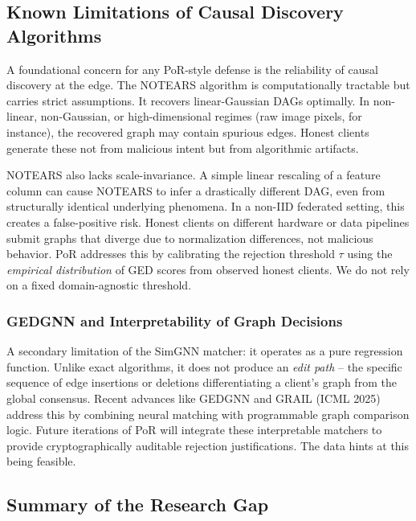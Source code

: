 \documentclass[journal]{IEEEtran}
\begin{document}
\subsection{Known Limitations of Causal Discovery Algorithms}

A foundational concern for any PoR-style defense is the reliability of causal discovery at the edge. The NOTEARS algorithm \cite{zheng2018} is computationally tractable but carries strict assumptions. It recovers linear-Gaussian DAGs optimally. In non-linear, non-Gaussian, or high-dimensional regimes (raw image pixels, for instance), the recovered graph may contain spurious edges. Honest clients generate these not from malicious intent but from algorithmic artifacts.

NOTEARS also lacks scale-invariance. A simple linear rescaling of a feature column can cause NOTEARS to infer a drastically different DAG, even from structurally identical underlying phenomena. In a non-IID federated setting, this creates a false-positive risk. Honest clients on different hardware or data pipelines submit graphs that diverge due to normalization differences, not malicious behavior. PoR addresses this by calibrating the rejection threshold $\tau$ using the \emph{empirical distribution} of GED scores from observed honest clients. We do not rely on a fixed domain-agnostic threshold.

\subsubsection{GEDGNN and Interpretability of Graph Decisions}
A secondary limitation of the SimGNN \cite{simgnn} matcher: it operates as a pure regression function. Unlike exact algorithms, it does not produce an \emph{edit path} -- the specific sequence of edge insertions or deletions differentiating a client's graph from the global consensus. Recent advances like GEDGNN \cite{piao2023} and GRAIL (ICML 2025) address this by combining neural matching with programmable graph comparison logic. Future iterations of PoR will integrate these interpretable matchers to provide cryptographically auditable rejection justifications. The data hints at this being feasible.

\subsection{Summary of the Research Gap}
\end{document}
